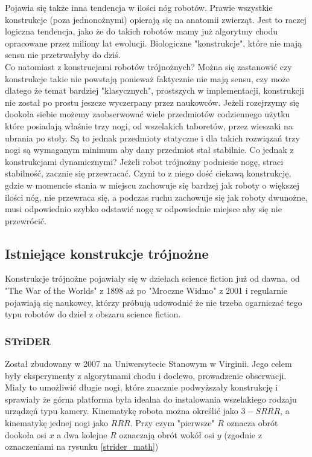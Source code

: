\documentclass[a4paper,13pt]{article}
\begin{document}
Pojawia się także inna tendencja w ilości nóg robotów. Prawie wszystkie konstrukcje (poza jednonożnymi) opierają się na anatomii zwierząt. Jest to raczej logiczna tendencja, jako że do takich robotów mamy już algorytmy chodu opracowane przez miliony lat ewolucji. Biologiczne "konstrukcje", które nie mają sensu nie przetrwałyby do dziś. \cite{history}\\

Co natomiast z konstrucjami robotów trójnożnych? Można się zastanowić czy konstrukcje takie nie powstają ponieważ faktycznie nie mają sensu, czy może dlatego że temat bardziej "klasycznych", prostszych w implementacji, konstrukcji nie został po prostu jeszcze wyczerpany przez naukowców. Jeżeli rozejrzymy się dookoła siebie możemy zaobserwować wiele przedmiotów codziennego użytku które posiadają właśnie trzy nogi, od wszelakich taboretów, przez wieszaki na ubrania po stoły. Są to jednak przedmioty statyczne i dla takich rozwiązań trzy nogi są wymaganym minimum aby dany przedmiot stał stabilnie. Co jednak z konstrukcjami dynamicznymi? Jeżeli robot trójnożny podniesie nogę, straci stabilność, zacznie się przewracać. Czyni to z niego dość ciekawą konstrukcję, gdzie w momencie stania w miejscu zachowuje się bardzej jak roboty o większej ilości nóg, nie przewraca się, a podczas ruchu zachowuje się jak roboty dwunożne, musi odpowiednio szybko odstawić nogę w odpowiednie miejsce aby się nie przewrócić.\\

\subsection{Istniejące konstrukcje trójnożne}
Konstrukcje trójnożne pojawiały się w dziełach science fiction już od dawna, od "The War of the Worlds" z 1898 aż po "Mroczne Widmo" z 2001 i regularnie pojawiają się naukowcy, którzy próbują udowodnić że nie trzeba ogarniczać tego typu robotów do dzieł z obszaru science fiction.\\
\subsubsection{STriDER} 
Został zbudowany w 2007 na Uniwersytecie Stanowym w Virginii. Jego celem były eksperymenty z algorytmami chodu i doclewo, prowadzenie obserwacji. Miały to umożliwić długie nogi, które znacznie podwyższały konstrukcję i sprawiały że górna platforma była idealna do instalowania wszelakiego rodzaju urządzęń typu kamery. Kinematykę robota można określić jako $3-SRRR$, a kinematykę jednej nogi jako $RRR$. Przy czym "pierwsze" $R$ oznacza obrót dookoła osi $x$ a dwa kolejne $R$ oznaczają obrót wokół osi $y$ (zgodnie z oznaczeniami na rysunku \ref{strider_math})  \cite{strider}\\
\end{document}
